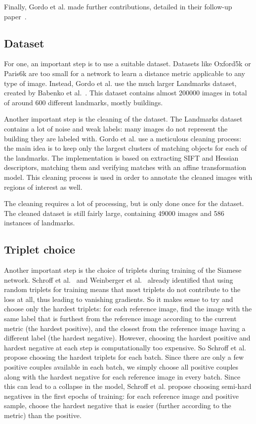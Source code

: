 Finally, Gordo et al. made further contributions, detailed in their
follow-up paper~\cite{gordo_end--end_2016}.
\subsection{Dataset}
For one, an important step is to use a suitable dataset. Datasets like
Oxford5k or Paris6k are too small for a network to learn a distance metric
applicable to any type of image. Instead, Gordo et al. use the much larger
Landmarks dataset, created by Babenko et al.~\cite{babenko_neural_2014}.
This dataset contains almost 200000 images in total of around 600
different landmarks, mostly buildings.

Another important step is the cleaning of the dataset. The Landmarks
dataset contains a lot of noise and weak labels: many images do not
represent the building they are labeled with. Gordo et al. use a meticulous
cleaning process: the main idea is to keep only the largest clusters
of matching objects for each of the landmarks. The implementation is
based on extracting SIFT and Hessian descriptors,
matching them and verifying matches with an affine transformation model.
This cleaning process is used in order to annotate the cleaned images
with regions of interest as well.

The cleaning requires a lot of processing,
but is only done once for the dataset.
The cleaned dataset is still fairly large, containing 49000 images and
586 instances of landmarks.

\subsection{Triplet choice}
Another important step is the choice of triplets during training of
the Siamese network. Schroff et al.~\cite{schroff_facenet:_2015}
and Weinberger et al.~\cite{weinberger_distance_2006} already identified
that using random triplets for training means that most triplets do not
contribute to the loss at all, thus leading to vanishing gradients.
So it makes sense to try and choose only the hardest triplets: for each
reference image, find the image with the same label that is furthest from the
reference image according to the current metric (the hardest positive),
and the closest from the reference image having a different label
(the hardest negative).
However, choosing the hardest positive and hardest negative at each step
is computationally too expensive.
So Schroff et al.~\cite{schroff_facenet:_2015}
propose choosing the hardest triplets for each batch. Since there are only
a few positive couples available in each batch, we simply choose all
positive couples along with the hardest negative for each reference image
in every batch. Since this can lead to a collapse in the model, Schroff
et al. propose choosing semi-hard negatives in the first epochs of
training: for each reference image and positive sample, choose the hardest
negative that is easier (further according to the metric) than the positive.

